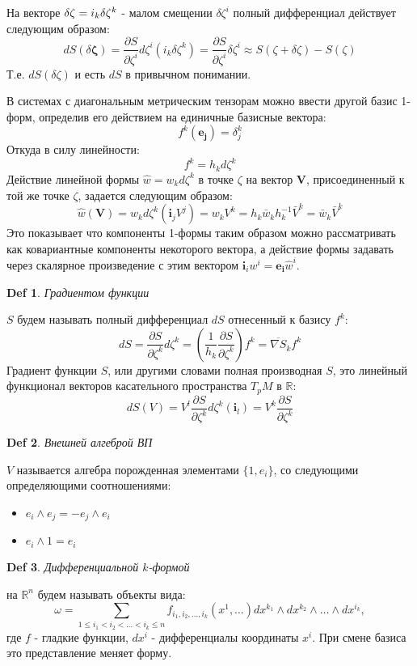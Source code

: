 \documentclass{article}
\newtheorem{defn}{Def}
\begin{document}
 	На векторе $\delta \boldmath{\zeta}= i_k \delta \zeta^k$ - малом смещении $\delta \zeta^i$ полный дифференциал действует следующим образом:
 	$$dS (\delta \mathbf{\zeta}) = \frac {\partial S}{\partial \zeta^i} d \zeta^i (i_k \delta \zeta^k) = \frac {\partial S}{\partial \zeta^i} \delta \zeta^i \approx S(\zeta + \delta\zeta) - S(\zeta)$$
 	Т.е. $dS(\delta \zeta)$ и есть $dS$ в привычном понимании.
 	
 	В системах с диагональным метрическим тензорам можно ввести другой базис 1-форм, определив его действием на единичные базисные вектора:
 	$$f^k (\mathbf{e_j}) = \delta^k_j$$
 	Откуда в силу линейности:
 	$$f^k = h_k d \zeta^k$$ 
 	Действие линейной формы $\hat{w} = w_k d \zeta^k$ в точке $\zeta$ на вектор $\mathbf{V}$, присоединенный к той же точке $\zeta$, задается следующим образом:
 	$$ \hat{w} (\mathbf{V}) = w_k d \zeta^k (\mathbf{i}_j V^j) = w_k V^k = h_k \bar{w}_k h^{-1}_k \bar{V}^k= \bar{w}_k \bar{V}^k $$
 	Это показывает что компоненты 1-формы таким образом можно рассматривать как ковариантные компоненты некоторого вектора, а действие формы задавать через скалярное произведение с этим вектором $\mathbf i_i w^i = \mathbf{e_i} \hat{w}^i$.
 	
 	\begin{defn}Градиентом функции\end{defn}$S$ будем называть полный дифференциал $dS$ отнесенный к базису $f^k$:
 	$$dS = \frac{\partial S}{\partial \zeta^k} d \zeta^k= (\frac{1}{h_k} \frac{\partial S}{\partial \zeta^k}) f^k = \overline{\nabla S}_k f^k$$
 	Градиент функции $S$, или другими словами полная производная $S$, это линейный функционал векторов касательного пространства $T_p M$ в $\mathbb{R}$:
 	$$dS(V) = V^l \frac{\partial S}{\partial \zeta^k} d \zeta^k (\mathbf{i}_l) = V^k \frac{\partial S}{\partial \zeta^k}$$
 	
 	
 	\begin{defn}Внешней алгеброй ВП \end{defn}$V$ называется алгебра порожденная элементами $\{1, e_i\}$, со следующими определяющими соотношениями:
 	\begin{itemize}
 		\item$ e_i \wedge e_j = - e_j \wedge e_i$
 		\item $e_i \wedge 1 = e_i$
 	\end{itemize}
 	
 	\begin{defn}Дифференциальной $k$-формой\end{defn} на $\mathbb{R}^n$ будем  называть объекты вида:
 	\begin{equation}
 	\label{form}
 	\omega = \sum_{1\leq i_1 < i_2 <\dots < i_k \leq n} f_{i_1, i_2, \dots, i_k} (x^1, \dots) dx^{k_1} \wedge dx^{k_2} \wedge \dots \wedge d x^{i_k},
 	\end{equation} 
 	где $f$ - гладкие функции, $dx^i$ - дифференциалы координаты $x^i$. При смене базиса это представление меняет форму.
 	
\end{document}
